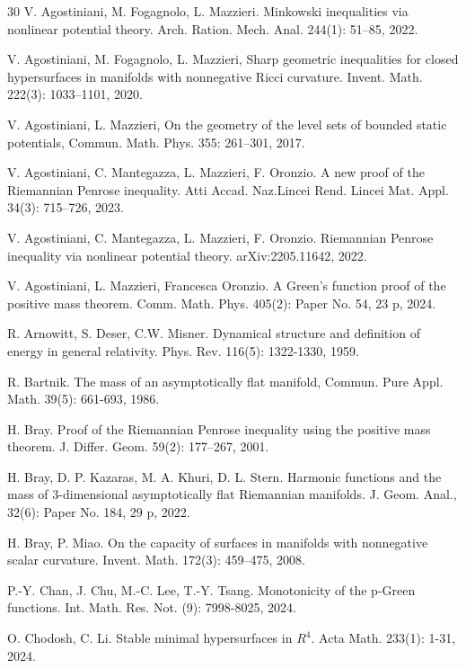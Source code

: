 \documentclass[12pt]{article}
\theoremstyle{definition}
\theoremstyle{plain}
\numberwithin{equation}{section}
\begin{document}
\begin{thebibliography}{30}
 V. Agostiniani, M. Fogagnolo, L. Mazzieri. Minkowski inequalities via nonlinear potential theory. Arch. Ration. Mech. Anal. 244(1): 51–85, 2022.

 V. Agostiniani, M. Fogagnolo, L. Mazzieri, Sharp geometric inequalities for closed hypersurfaces in manifolds with nonnegative Ricci curvature. Invent. Math. 222(3):  1033–1101, 2020.

 V. Agostiniani, L. Mazzieri, On the geometry of the level sets of bounded static potentials, Commun. Math. Phys. 355:  261–301, 2017.
	
 V. Agostiniani, C. Mantegazza, L. Mazzieri, F. Oronzio. A new proof of the Riemannian Penrose inequality. Atti Accad. Naz.Lincei Rend. Lincei Mat. Appl. 34(3): 715–726, 2023.

 V. Agostiniani, C. Mantegazza, L. Mazzieri, F. Oronzio. Riemannian Penrose inequality via nonlinear potential theory. arXiv:2205.11642, 2022.

 V. Agostiniani, L. Mazzieri, Francesca Oronzio. A Green’s function proof of the positive mass theorem. Comm. Math. Phys. 405(2): Paper No. 54, 23 p, 2024.

 R. Arnowitt, S. Deser, C.W. Misner. Dynamical structure and definition of energy in general relativity. Phys. Rev. 116(5): 1322-1330, 1959.

 R. Bartnik. The mass of an asymptotically flat manifold, Commun. Pure Appl. Math. 39(5): 661-693, 1986.

 H. Bray. Proof of the Riemannian Penrose inequality using the positive mass theorem. J. Differ. Geom. 59(2): 177–267, 2001.

 H. Bray, D. P. Kazaras, M. A. Khuri, D. L. Stern. Harmonic functions and the mass of 3-dimensional asymptotically flat Riemannian manifolds. J. Geom. Anal., 32(6): Paper No. 184, 29 p, 2022.

 H. Bray, P. Miao. On the capacity of surfaces in manifolds with nonnegative scalar curvature. Invent. Math. 172(3): 459–475, 2008.

 P.-Y. Chan, J. Chu, M.-C. Lee, T.-Y. Tsang. Monotonicity of the p-Green functions. Int. Math. Res. Not. (9): 7998-8025, 2024.

 O. Chodosh, C. Li. Stable minimal hypersurfaces in $R^{4}$. Acta Math. 233(1): 1-31, 2024.


\end{thebibliography}
\end{document}
